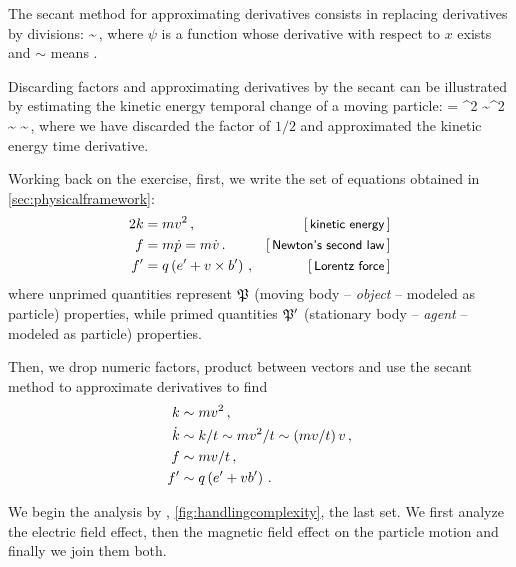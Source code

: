 The secant method for approximating derivatives consists in replacing derivatives by divisions:
%
\beq
   \sim {}\,,
\eeq
%
where $\psi$ is a function whose derivative with respect to $x$ exists and $\sim$ means .

Discarding factors and approximating derivatives by the secant can be illustrated by estimating the kinetic energy temporal change of a moving particle:
%
\beq
  \ekin = \mass\vel^2
        \sim\mass\vel^2
  \implies
  \dt\ekin \sim {} 
           \sim {}\,,
\eeq
%
where we have discarded the factor of $1/2$ and approximated the kinetic energy time derivative.

Working back on the exercise, first, we write the set of equations obtained in \cref{sec:physicalframework}:
%
\begin{align*}
  2\ekin  &= \mass\vel^2\,,                                   &\eqtxt{kinetic energy} \\
  \force  &= \mass\dt\mom = \mass\dt\vel\,.                   &\eqtxt{Newton's second law} \\
  \force' &= \echarge\parth{\efield' + \vel\cprod\mfield'}\,, &\eqtxt{Lorentz force}
\end{align*}
%
where unprimed quantities represent $\mathfrak{P}$ (moving body -- \emph{object} -- modeled as particle) properties, while primed quantities $\mathfrak{P}'$ (stationary body -- \emph{agent} -- modeled as particle) properties.

Then, we drop numeric factors, product between vectors and use the secant method to approximate derivatives to find
%
\begin{align*}
  k    &\sim mv^2\,, \\
  \dot{k} &\sim k/t \sim mv^2/t \sim \left({mv/t}\right)v\,, \\
  f   &\sim mv/t\,, \\
  f'  &\sim q\left({e' + vb'}\right)\,.
\end{align*}

We begin the analysis by , \vide \cref{fig:handlingcomplexity}, the last set. We first analyze the electric field effect, then the magnetic field effect on the particle motion and finally we join them both.

